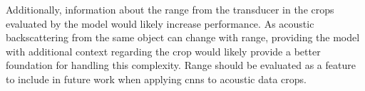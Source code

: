     
    
    

    

    
    Additionally, information about the range from the transducer in the crops evaluated by the model would likely increase performance. As acoustic backscattering from the same object can change with range, providing the model with additional context regarding the crop would likely provide a better foundation for handling this complexity. Range should be evaluated as a feature to include in future work when applying \gls{cnn}s to acoustic data crops. 

